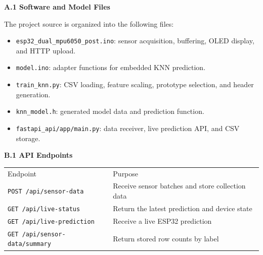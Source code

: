 
\vspace{1cm}

\begin{flushleft}
\textbf{A.1 Software and Model Files}

The project source is organized into the following files:
\begin{itemize}
	\item \texttt{esp32\_dual\_mpu6050\_post.ino}: sensor acquisition, buffering, OLED display, and HTTP upload.
	\item \texttt{model.ino}: adapter functions for embedded KNN prediction.
	\item \texttt{train\_knn.py}: CSV loading, feature scaling, prototype selection, and header generation.
	\item \texttt{knn\_model.h}: generated model data and prediction function.
	\item \texttt{fastapi\_api/app/main.py}: data receiver, live prediction API, and CSV storage.
\end{itemize}
\end{flushleft}

\newpage
{}
\vspace{1cm}

\begin{flushleft}
\textbf{B.1 API Endpoints}

\begin{tabular}{l l}
Endpoint & Purpose \\
\texttt{POST /api/sensor-data} & Receive sensor batches and store collection data \\
\texttt{GET /api/live-status} & Return the latest prediction and device state \\
\texttt{GET /api/live-prediction} & Receive a live ESP32 prediction \\
\texttt{GET /api/sensor-data/summary} & Return stored row counts by label \\
\end{tabular}
\end{flushleft}




